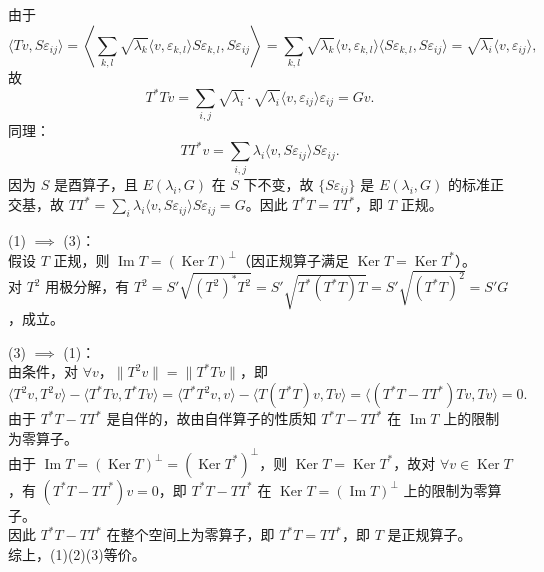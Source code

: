 \documentclass{ctexart}
\begin{document}
\begin{enumerate}
    由于
    \[\langle T v, S \varepsilon_{ij} \rangle = \left\langle \sum_{k,l} \sqrt{\lambda_k} \langle v, \varepsilon_{k,l} \rangle S \varepsilon_{k,l}, S \varepsilon_{ij} \right\rangle = \sum_{k,l} \sqrt{\lambda_k} \langle v, \varepsilon_{k,l} \rangle \langle S \varepsilon_{k,l}, S \varepsilon_{ij} \rangle = \sqrt{\lambda_i} \langle v, \varepsilon_{ij} \rangle,\]
    故\[T^* T v = \sum_{i,j} \sqrt{\lambda_i}\cdot\sqrt{\lambda_i} \langle v, \varepsilon_{ij} \rangle \varepsilon_{ij} = G v.\]
    同理：\[T T^* v = \sum_{i,j} \lambda_i \langle v, S \varepsilon_{ij} \rangle S \varepsilon_{ij}.\]
    因为 $S$ 是酉算子，且 $E(\lambda_i, G)$ 在 $S$ 下不变，故 \(\{S \varepsilon_{ij}\}\) 是 \(E(\lambda_i, G)\) 的标准正交基，故 \(T T^* = \displaystyle\sum_i \lambda_i \langle v, S \varepsilon_{ij} \rangle S \varepsilon_{ij} = G\)。因此 \(T^* T = T T^*\)，即 \(T\) 正规。

    (1) \(\implies\) (3)：\\
    假设 \(T\) 正规，则 \(\operatorname{Im} T = (\operatorname{Ker} T)^\perp\)（因正规算子满足 \(\operatorname{Ker} T = \operatorname{Ker} T^*\)）。 \\
    对 $T^2$ 用极分解，有 $T^2=S'\sqrt{(T^2)^*T^2}=S'\sqrt{T^*(T^*T)T}=S'\sqrt{(T^*T)^2}=S'G$，成立。

    (3) \(\implies\) (1)：\\
    由条件，对 $\forall v$，$\|T^2v\|=\|T^*Tv\|$，即
    \[\langle T^2v,T^2v \rangle-\langle T^*Tv,T^*Tv \rangle=\langle T^*T^2v,v \rangle-\langle T(T^*T)v,Tv \rangle=\langle (T^*T-TT^*)Tv,Tv \rangle=0.\]
    由于 $T^*T-TT^*$ 是自伴的，故由自伴算子的性质知 $T^*T-TT^*$ 在 $\operatorname{Im} T$ 上的限制为零算子。 \\
    由于 $\operatorname{Im} T=(\operatorname{Ker} T)^\perp=(\operatorname{Ker} T^*)^\perp$，则 $\operatorname{Ker} T = \operatorname{Ker} T^*$，故对 $\forall v\in \operatorname{Ker} T$，有 $(T^*T-TT^*)v=0$，即 $T^*T-TT^*$ 在 $\operatorname{Ker} T=(\operatorname{Im} T)^\perp$ 上的限制为零算子。\\
    因此 $T^*T-TT^*$ 在整个空间上为零算子，即 $T^*T=TT^*$，即 $T$ 是正规算子。\\
    综上，(1)(2)(3)等价。

\end{enumerate}
\end{document}
